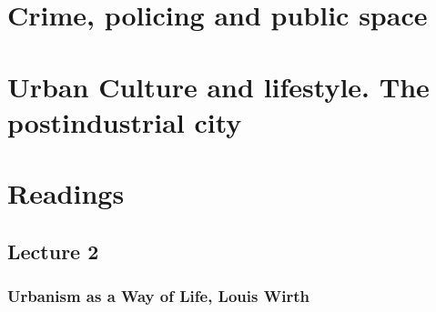\documentclass{article}
\begin{document}

\section{Crime, policing and public space}
\date{September 28th, 2021}


\section{Urban Culture and lifestyle. The postindustrial city}
\date{September 28th, 2021}


\section{Readings}

\subsection{Lecture 2}

\subsubsection{Urbanism as a Way of Life, Louis Wirth}
\end{document}
